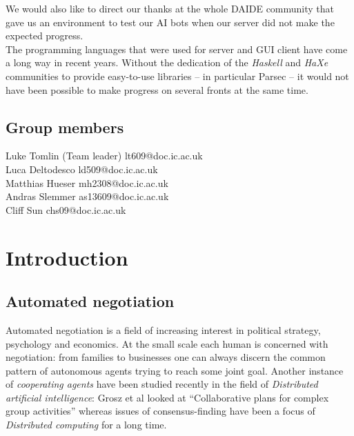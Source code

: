 \documentclass[pdftex,11pt,a4paper]{report}
\begin{document}
We would also like to direct our thanks at the whole DAIDE community
that gave us an environment to test our AI bots when our server did
not make the expected progress. \\

The programming languages that were used for server and GUI client
have come a long way in recent years. Without the dedication of the
\textit{Haskell} and \textit{HaXe} communities to provide easy-to-use
libraries -- in particular Parsec \cite{ParsecLib} -- it would not have
been possible to make progress on several fronts at the same time.


\section{Group members} 
Luke Tomlin (Team leader) lt609@doc.ic.ac.uk \\ 
Luca Deltodesco ld509@doc.ic.ac.uk \\ 
Matthias Hueser mh2308@doc.ic.ac.uk \\
Andras Slemmer as13609@doc.ic.ac.uk \\
Cliff Sun chs09@doc.ic.ac.uk \\


\pagebreak

\chapter{Introduction}

\section{Automated negotiation}

Automated negotiation is a field of increasing interest in political
strategy, psychology and economics. At the small scale each human is
concerned with negotiation: from families to businesses one can always
discern the common pattern of autonomous agents trying to reach some
joint goal. Another instance of \textit{cooperating agents} have been
studied recently in the field of \textit{Distributed artificial
  intelligence}: Grosz et al looked at ``Collaborative plans for
complex group activities'' \cite{Grosz96} whereas issues of
consensus-finding have been a focus of \textit{Distributed computing}
for a long time. \\
\end{document}
